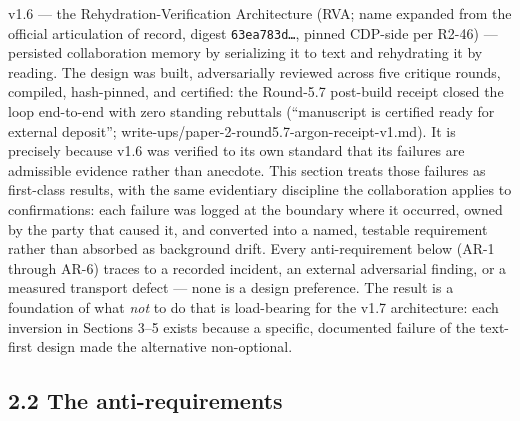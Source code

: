 \documentclass[11pt]{article}
\begin{document}
v1.6 --- the Rehydration-Verification Architecture (RVA; name expanded from the official articulation of record, digest \texttt{63ea783d…}, pinned CDP-side per R2-46) --- persisted collaboration memory by serializing it to text and rehydrating it by reading. The design was built, adversarially reviewed across five critique rounds, compiled, hash-pinned, and certified: the Round-5.7 post-build receipt closed the loop end-to-end with zero standing rebuttals (``manuscript is certified ready for external deposit''; write-ups/paper-2-round5.7-argon-receipt-v1.md). It is precisely because v1.6 was verified to its own standard that its failures are admissible evidence rather than anecdote. This section treats those failures as first-class results, with the same evidentiary discipline the collaboration applies to confirmations: each failure was logged at the boundary where it occurred, owned by the party that caused it, and converted into a named, testable requirement rather than absorbed as background drift. Every anti-requirement below (AR-1 through AR-6) traces to a recorded incident, an external adversarial finding, or a measured transport defect --- none is a design preference. The result is a foundation of what \emph{not} to do that is load-bearing for the v1.7 architecture: each inversion in Sections 3--5 exists because a specific, documented failure of the text-first design made the alternative non-optional.

\subsection{2.2 The anti-requirements}\label{the-anti-requirements}
\end{document}
